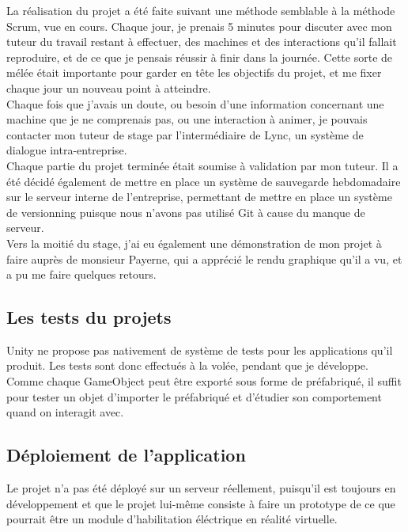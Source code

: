 \documentclass[a4paper]{article}
\begin{document}
    La réalisation du projet a été faite suivant une méthode semblable à la méthode Scrum, vue en cours. Chaque jour, je prenais 5 minutes pour discuter avec mon tuteur du travail restant à effectuer, des machines et des interactions qu'il fallait reproduire, et de ce que je pensais réussir à finir dans la journée. Cette sorte de mélée était importante pour garder en tête les objectifs du projet, et me fixer chaque jour un nouveau point à atteindre. \\

    Chaque fois que j'avais un doute, ou besoin d'une information concernant une machine que je ne comprenais pas, ou une interaction à animer, je pouvais contacter mon tuteur de stage par l'intermédiaire de Lync, un système de dialogue intra-entreprise. \\

    Chaque partie du projet terminée était soumise à validation par mon tuteur. Il a été décidé également de mettre en place un système de sauvegarde hebdomadaire sur le serveur interne de l'entreprise, permettant de mettre en place un système de versionning puisque nous n'avons pas utilisé Git à cause du manque de serveur. \\

    Vers la moitié du stage, j'ai eu également une démonstration de mon projet à faire auprès de monsieur Payerne, qui a apprécié le rendu graphique qu'il a vu, et a pu me faire quelques retours. \\

    \subsection{Les tests du projets}

    Unity ne propose pas nativement de système de tests pour les applications qu'il produit. Les tests sont donc effectués à la volée, pendant que je développe. Comme chaque GameObject peut être exporté sous forme de préfabriqué, il suffit pour tester un objet d'importer le préfabriqué et d'étudier son comportement quand on interagit avec.

    \subsection{Déploiement de l'application}
   
    Le projet n'a pas été déployé sur un serveur réellement, puisqu'il est toujours en développement et que le projet lui-même consiste à faire un prototype de ce que pourrait être un module d'habilitation éléctrique en réalité virtuelle. \\
\end{document}
